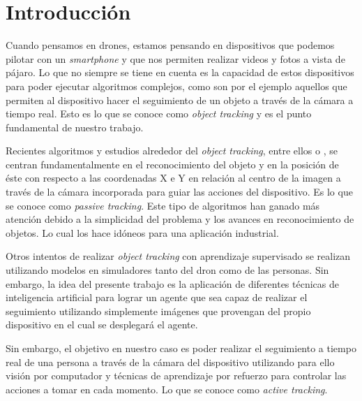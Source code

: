 
\cleardoublepage

\chapter{Introducción}
\label{introduccion}

Cuando pensamos en drones, estamos pensando en dispositivos que podemos pilotar con un \textit{smartphone} y que nos permiten realizar videos y fotos a vista de pájaro. Lo que no siempre se tiene en cuenta es la capacidad de estos dispositivos para poder ejecutar algoritmos complejos, como son por el ejemplo aquellos que permiten al dispositivo hacer el seguimiento de un objeto a través de la cámara a tiempo real. Esto es lo que se conoce como \textit{object tracking} y es el punto fundamental de nuestro trabajo.
\medskip


Recientes algoritmos y estudios alrededor del \textit{object tracking}, entre ellos \citet{activetracking} o \citet{zhou2021space}, se centran fundamentalmente en el reconocimiento del objeto y en la posición de éste con respecto a las coordenadas X e Y en relación al centro de la imagen a través de la cámara incorporada para guiar las acciones del dispositivo. Es lo que se conoce como \textit{passive tracking}. Este tipo de algoritmos han ganado más atención debido a la simplicidad del problema y los avances en reconocimiento de objetos. Lo cual los hace idóneos para una aplicación industrial.
\medskip

Otros intentos de realizar \textit{object tracking} con aprendizaje supervisado se realizan utilizando modelos en simuladores tanto del dron como de las personas. Sin embargo, la idea del presente trabajo es la aplicación de diferentes técnicas de inteligencia artificial para lograr un agente que sea capaz de realizar el seguimiento utilizando simplemente imágenes que provengan del propio dispositivo en el cual se desplegará el agente.
\medskip

Sin embargo, el objetivo en nuestro caso es poder realizar el seguimiento a tiempo real de una persona a través de la cámara del dispositivo utilizando para ello visión por computador y técnicas de aprendizaje por refuerzo para controlar las acciones a tomar en cada momento. Lo que se conoce como \textit{active tracking}. 
\medskip

